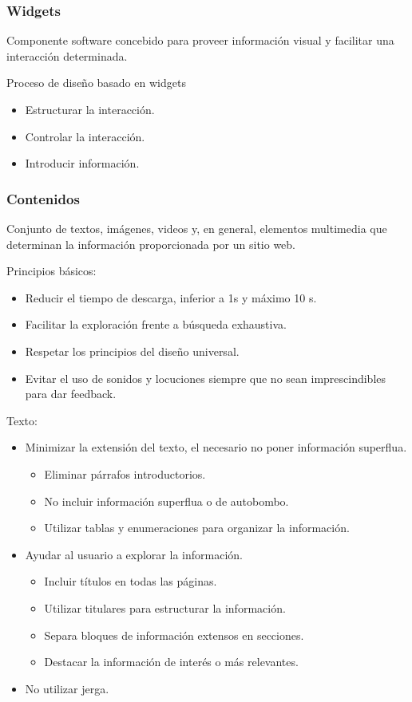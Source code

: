\documentclass[12pt, twoside, openright]{report} %
\begin{document}
\subsubsection{Widgets}
Componente software concebido para proveer información visual y facilitar una interacción determinada.

Proceso de diseño basado en widgets
\begin{itemize}
  \item Estructurar la interacción.
  \item Controlar la interacción.
  \item Introducir información.
\end{itemize}					
\pagebreak
\subsubsection{Contenidos}
Conjunto de textos, imágenes, videos y, en general, elementos multimedia que determinan la información proporcionada por un sitio web.

Principios básicos:
\begin{itemize}
  \item Reducir el tiempo de descarga, inferior a 1s y máximo 10 s.
  \item Facilitar la exploración frente a búsqueda exhaustiva.
  \item Respetar los principios del diseño universal.
  \item Evitar el uso de sonidos y locuciones siempre que no sean imprescindibles para dar feedback.
\end{itemize}
		
Texto:
\begin{itemize}
  \item Minimizar la extensión del texto, el necesario no poner información superflua.
  \begin{itemize}
    \item Eliminar párrafos introductorios.
    \item No incluir información superflua o de autobombo.
    \item Utilizar tablas y enumeraciones para organizar la información.
  \end{itemize}
  
  \item Ayudar al usuario a explorar la información.
  \begin{itemize}
    \item Incluir títulos en todas las páginas.
    \item Utilizar titulares para estructurar la información.
    \item Separa bloques de información extensos en secciones.
    \item Destacar la información de interés o más relevantes.
  \end{itemize}
 
  \item No utilizar jerga.
\end{itemize}
			
\end{document}
